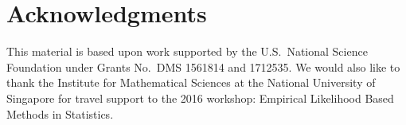 \documentclass[notitlepage]{article}
\begin{document}




\section{Acknowledgments}

This material is based upon work supported by the U.S.~National Science
Foundation under Grants No.~DMS 1561814 and 1712535. We would also like to thank the Institute for Mathematical Sciences at the National University of Singapore for travel support to the 2016 workshop: Empirical Likelihood Based Methods in Statistics.



\end{document}
